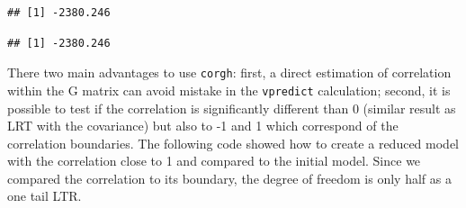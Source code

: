 \documentclass[
  12pt,
]{book}
\newenvironment{Shaded}{\begin{snugshade}}{\end{snugshade}}
\newcommand{\FunctionTok}[1]{\textcolor[rgb]{0.00,0.00,0.00}{#1}}
\newcommand{\NormalTok}[1]{#1}
\newcommand{\SpecialCharTok}[1]{\textcolor[rgb]{0.00,0.00,0.00}{#1}}
\begin{document}
\begin{verbatim}
## [1] -2380.246
\end{verbatim}

\begin{Shaded}
\end{Shaded}

\begin{verbatim}
## [1] -2380.246
\end{verbatim}

There two main advantages to use \texttt{corgh}: first, a direct estimation of correlation within the G matrix can avoid mistake in the \texttt{vpredict} calculation; second, it is possible to test if the correlation is significantly different than 0 (similar result as LRT with the covariance) but also to -1 and 1 which correspond of the correlation boundaries.
The following code showed how to create a reduced model with the correlation close to 1 and compared to the initial model.
Since we compared the correlation to its boundary, the degree of freedom is only half as a one tail LTR.
\end{document}

